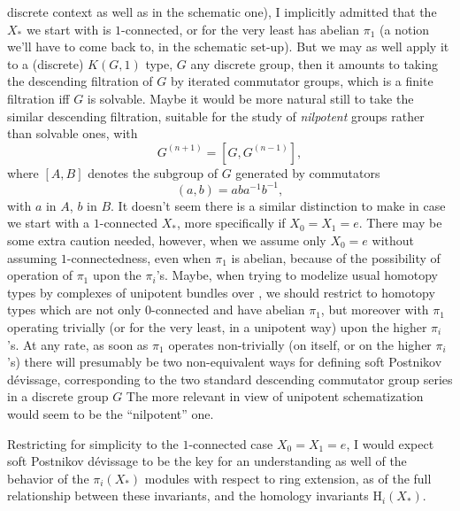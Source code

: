 discrete context as well as in the schematic one), I implicitly
admitted that the $X_*$ we start with is $1$-connected, or for the
very least has abelian $\pi_1$ (a notion we'll have to come back to,
in the schematic set-up). But we may as well apply it to a (discrete)
$K(G,1)$ type, $G$ any discrete group, then it amounts to taking the
descending filtration of $G$ by iterated commutator groups, which is a
finite filtration if{f} $G$ is solvable. Maybe it would be more
natural still to take the similar descending filtration, suitable for
the study of \emph{nilpotent} groups rather than solvable ones,
with
\begin{equation}
  \label{eq:113.D}
  G^{(n+1)} = [G, G^{(n-1)}],\tag{D}
\end{equation}
where $[A,B]$ denotes the subgroup of $G$ generated by commutators
\[(a,b)=aba^{-1}b^{-1},\]
with $a$ in $A$, $b$ in $B$. It doesn't seem there is a similar
distinction to make in case we start with a $1$-connected $X_*$, more
specifically if $X_0=X_1=e$. There may be some extra caution needed,
however, when we assume only $X_0=e$ without assuming
$1$-connectedness, even when $\pi_1$ is abelian, because
of the possibility of operation of $\pi_1$ upon the $\pi_i$'s. Maybe,
when trying to modelize usual homotopy types by complexes of unipotent
bundles over \bZ, we should restrict to homotopy types which are not
only $0$-connected and have abelian $\pi_1$, but moreover with $\pi_1$
operating trivially (or for the very least, in a unipotent way) upon
the higher $\pi_i$'s. At any rate, as soon as $\pi_1$ operates
non-trivially (on itself, or on the higher $\pi_i$'s) there will
presumably be two non-equivalent ways for defining soft Postnikov
dévissage, corresponding to the two standard descending commutator
group series in a discrete group $G$ The more relevant in view of
unipotent schematization would seem to be the ``nilpotent'' one.

Restricting for simplicity to the $1$-connected case $X_0=X_1=e$, I
would expect soft Postnikov dévissage to be the key for an
understanding as well of the behavior of the $\pi_i(X_*)$ modules with
respect to ring extension, as of the full relationship between these
invariants, and the homology invariants $\mathrm H_i(X_*)$.

\starsbreak

